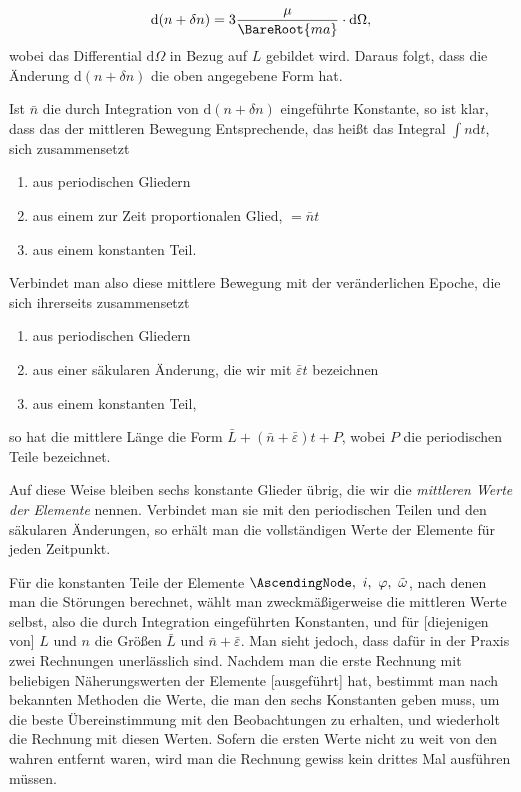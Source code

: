 \[
\mathrm{d}(n+\delta n)=3\frac{\mu}{\BareRoot{ma}}\cdot\mathrm{d}\Omega,
\]
wobei das Differential \(\mathrm{d}\Omega\) in Bezug auf \(L\) gebildet wird. Daraus folgt, dass die Änderung \(\mathrm{d}(n+\delta n)\) die oben angegebene Form hat.
\par
Ist \(\bar n\) die durch Integration von \(\mathrm{d}(n+\delta n)\) eingeführte Konstante, so ist klar, dass das der mittleren Bewegung Entsprechende, das heißt das Integral \(\int n\mathrm{d}t\), sich zusammensetzt
\begin{enumerate}\setlength{\itemsep}{0pt}\setlength{\parsep}{0pt}
\item[1)] aus periodischen Gliedern
\item[2)] aus einem zur\raisebox{.45ex}{-} Zeit proportionalen Glied, \(=\bar n t\)
\item[3)] aus einem konstanten Teil.
\end{enumerate}
\par
Verbindet man also diese mittlere Bewegung mit der veränderlichen Epoche, die sich ihrerseits zusammensetzt
\begin{enumerate}\setlength{\itemsep}{0pt}\setlength{\parsep}{0pt}
\item[1)] aus periodischen Gliedern
\item[2)] aus einer säkularen Änderung, die wir mit \(\bar\varepsilon t\) bezeichnen
\item[3)] aus einem konstanten Teil,
\end{enumerate}
\noindent so hat die mittlere Länge die Form \(\bar L+(\bar n+\bar\varepsilon)t+P\), wobei \(P\) die periodischen Teile bezeichnet.
\par
Auf diese Weise bleiben sechs konstante Glieder übrig, die wir die \textit{mittleren Werte der Elemente} nennen. Verbindet man sie mit den periodischen Teilen und den säkularen Änderungen, so erhält man die vollständigen Werte der Elemente für jeden Zeitpunkt.
\par
Für die konstanten Teile der Elemente \(\AscendingNode,\ i,\ \varphi,\ \tilde\omega\), nach denen man die Störungen berechnet, wählt man zweckmäßigerweise die mittleren Werte selbst, also die durch Integration eingeführten Konstanten, und für [diejenigen von] \(L\) und \(n\) die Größen \(\bar L\) und \(\bar n+\bar\varepsilon\). Man sieht jedoch, dass dafür in der Praxis zwei Rechnungen unerlässlich sind. Nachdem man die erste Rechnung mit beliebigen Näherungswerten der Elemente [ausgeführt] hat, bestimmt man nach bekannten Methoden die Werte, die man den sechs Konstanten geben muss, um die beste Übereinstimmung mit den Beobachtungen zu erhalten, und wiederholt die Rechnung mit diesen Werten. Sofern die ersten Werte nicht zu weit von den wahren entfernt waren, wird man die Rechnung gewiss kein drittes Mal ausführen müssen.
\par\endgroup
